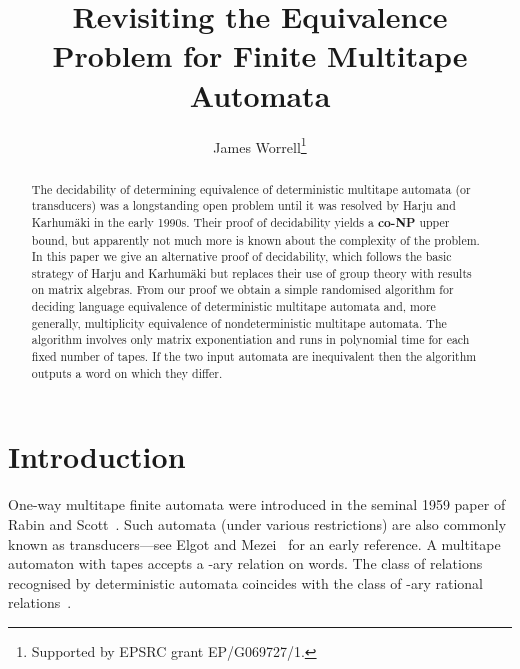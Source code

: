 \documentclass[runningheads]{llncs}
\begin{document}
\title{Revisiting the Equivalence Problem for Finite Multitape Automata}
\author{ James
  Worrell\thanks{Supported by EPSRC grant EP/G069727/1.}}

\maketitle

\begin{abstract}
  The decidability of determining equivalence of deterministic
  multitape automata (or transducers) was a longstanding open problem
  until it was resolved by Harju and Karhum\"{a}ki in the early 1990s.
  Their proof of decidability yields a \textbf{co-NP} upper bound, but
  apparently not much more is known about the complexity of the
  problem.  In this paper we give an alternative proof of
  decidability, which follows the basic strategy of Harju and
  Karhum\"{a}ki but replaces their use of group theory with results on
  matrix algebras.  From our proof we obtain a simple randomised
  algorithm for deciding language equivalence of deterministic
  multitape automata and, more generally, multiplicity equivalence of
  nondeterministic multitape automata.  The algorithm involves only
  matrix exponentiation and runs in polynomial time for each fixed
  number of tapes.  If the two input automata are inequivalent then
  the algorithm outputs a word on which they differ.
\end{abstract}

\section{Introduction}
One-way multitape finite automata were introduced in the seminal 1959
paper of Rabin and Scott~\cite{RabinS59}.  Such automata (under
various restrictions) are also commonly known as transducers---see
Elgot and Mezei~\cite{ElgotM63} for an early reference.  A multitape
automaton with  tapes accepts a -ary relation on words.  The
class of relations recognised by deterministic automata coincides with
the class of -ary rational relations~\cite{ElgotM63}.
\end{document}
